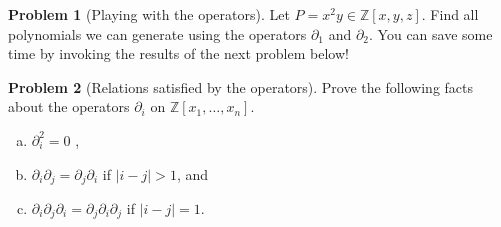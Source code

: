 \documentclass{amsart}
\newcommand{\+}[1]{\ensuremath{\mathbf{#1}}}
\newcommand{\Z}{{\mathbb Z}}
\theoremstyle{definition}
\newtheorem{prob}{Problem}
\begin{document}
\begin{prob}[Playing with the operators]
 Let $P = x^2 y \in \Z[x,y,z]$.
 Find all polynomials we can generate using the operators $\partial_1$ and $\partial_2$.
 You can save some time by invoking the results of the next problem below!
\end{prob}

\begin{prob}[Relations satisfied by the operators]
Prove the following facts about the operators $\partial_i$ on $\mathbb{Z}[x_1,\ldots,x_n]$.
 \begin{enumerate}[(a)]
  \item $\partial_i^2 = 0$ ,
  \item $\partial_i \partial_j = \partial_j \partial_i$ if $|i-j| > 1$, and
  \item $\partial_i \partial_j  \partial_i = \partial_j \partial_i  \partial_j$ if $|i-j| =1$.
 \end{enumerate}
\end{prob}
\end{document}

